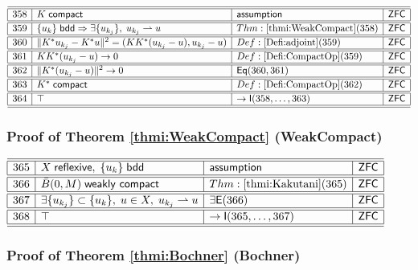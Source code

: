 \documentclass[11pt,reqno]{amsart}
\begin{document}
\noindent$%
\begin{array}{|r|l|l|l|}
\hline\hline
358 & K\;\mathsf{compact} & \mathsf{assumption} & \mathsf{ZFC} \\ \hline\hline
359 & \{u_{k}\}\;\mathsf{bdd}\Rightarrow\exists\{u_{k_{j}}\},\;u_{k_{j}}\rightharpoonup u & Thm:\ref{thmi:WeakCompact}(358) & \mathsf{ZFC} \\ \hline\hline
360 & \|K^{*}u_{k_{j}}-K^{*}u\|^{2}=(KK^{*}(u_{k_{j}}-u),u_{k_{j}}-u) & Def:\ref{Defi:adjoint}(359) & \mathsf{ZFC} \\ \hline\hline
361 & KK^{*}(u_{k_{j}}-u)\to0 & Def:\ref{Defi:CompactOp}(359) & \mathsf{ZFC} \\ \hline\hline
362 & \|K^{*}(u_{k_{j}}-u)\|^{2}\to0 & \mathsf{Eq}(360,361) & \mathsf{ZFC} \\ \hline\hline
363 & K^{*}\;\mathsf{compact} & Def:\ref{Defi:CompactOp}(362) & \mathsf{ZFC} \\ \hline\hline
364 & \top & \to\mathsf{I}(358,\dots,363) & \mathsf{ZFC} \\ \hline\hline
\end{array}%
$

\medskip

\subsubsection*{Proof of Theorem \ref{thmi:WeakCompact} (\textsf{WeakCompact})}

\noindent$%
\begin{array}{|r|l|l|l|}
\hline\hline
365 & X\;\mathsf{reflexive},\;\{u_{k}\}\;\mathsf{bdd} & \mathsf{assumption} & \mathsf{ZFC} \\ \hline\hline
366 & \bar{B}(0,M)\;\mathsf{weakly\ compact} & Thm:\ref{thmi:Kakutani}(365) & \mathsf{ZFC} \\ \hline\hline
367 & \exists\{u_{k_{j}}\}\subset\{u_{k}\},\;u\in X,\;u_{k_{j}}\rightharpoonup u & \exists\mathsf{E}(366) & \mathsf{ZFC} \\ \hline\hline
368 & \top & \to\mathsf{I}(365,\dots,367) & \mathsf{ZFC} \\ \hline\hline
\end{array}%
$

\medskip

\subsubsection*{Proof of Theorem \ref{thmi:Bochner} (\textsf{Bochner})}
\end{document}
